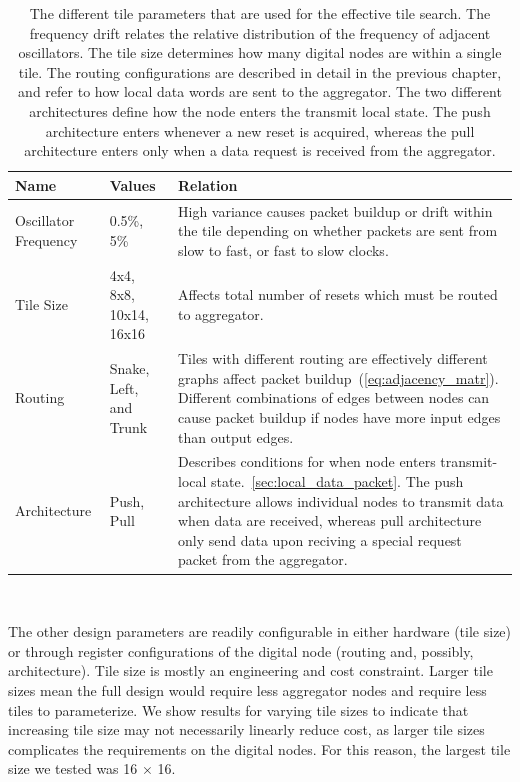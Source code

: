 \begin{table}
\begin{center}
\begin{tabular}{|| p{30mm} | p{30mm} | p{90mm} ||}
 \hline
 Name & Values & Relation \\ [0.5ex]
 \hline\hline
  Oscillator Frequency & 0.5\%, 5\% & High variance causes packet buildup or drift within the tile depending on whether packets are sent from slow to fast, or fast to slow clocks. \\
 \hline
  Tile Size & 4x4, 8x8, 10x14, 16x16 & Affects total number of resets which must be routed to aggregator.\\
 \hline
  Routing & Snake, Left, and Trunk & Tiles with different routing are effectively different graphs affect packet buildup~(\ref{eq:adjacency_matr}). Different combinations of edges between nodes can cause packet buildup if nodes have more input edges than output edges.  \\
 \hline
  Architecture & Push, Pull & Describes conditions for when node enters transmit-local state.~\ref{sec:local_data_packet}. The push architecture allows individual nodes to transmit data when data are received, whereas pull architecture only send data upon reciving a special request packet from the aggregator.  \\
 \hline
\end{tabular}
\caption{The different tile parameters that are used for the effective tile search.
  The frequency drift relates the relative distribution of the frequency of adjacent oscillators.
  The tile size determines how many digital nodes are within a single tile.
  The routing configurations are described in detail in the previous chapter, and refer to how local data words are sent to the aggregator.
  The two different architectures define how the node enters the transmit local state.
  The push architecture enters whenever a new reset is acquired, whereas the pull architecture enters only when a data request is received from the aggregator.}
\end{center}
\end{table}
~\label{table:tile_params}

The other design parameters are readily configurable in either hardware (tile size) or through register configurations of the digital node (routing and, possibly, architecture).
Tile size is mostly an engineering and cost constraint.
Larger tile sizes mean the full design would require less aggregator nodes and require less tiles to parameterize.
We show results for varying tile sizes to indicate that increasing tile size may not necessarily linearly reduce cost, as larger tile sizes complicates the requirements on the digital nodes.
For this reason, the largest tile size we tested was 16 $\times$ 16.

